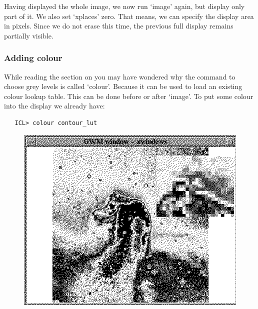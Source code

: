    Having displayed the whole image, we now run `image' again, but
   display only part of it. We also set `xplaces' zero. That means, we
   can specify the display area in pixels. Since we do not erase this
   time, the previous full display remains partially visible.


\subsubsection{\label{lookimagcolour}Adding colour}

   While reading
   {the section on }
   you may have wondered
   why the command to choose grey levels is called `colour'. Because
   it can be used to load an existing colour lookup table. This can be
   done before or after `image'. To put some colour into the display
   we already have:

\begin{verbatim}
   ICL> colour contour_lut
\end{verbatim}

\begin{latexonly}
\begin{figure}[htb]
\begin{center}
\includegraphics{sun86_imag3.eps}
\end{center}
\end{figure}
\end{latexonly}

